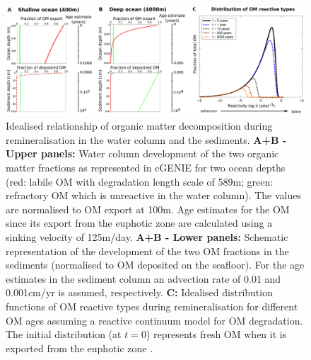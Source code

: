 \documentclass[gmd, manuscript]{copernicus}
\begin{document}
\begin{figure}[htbp]
\begin{center}
	\includegraphics[width=1.0\textwidth]{figures/OM_reactivity/OM_degradation_0808_updated.pdf}
	\caption{Idealised relationship of organic matter decomposition during remineralisation in the water column and the sediments. 
	\textbf{A+B - Upper panels:} Water column development of the two organic matter fractions as represented in cGENIE for two ocean depths 
	(red: labile OM with degradation length scale of 589m; green: refractory OM which is unreactive in the water column). The values are normalised to OM export at 100m. 
	Age estimates for the OM since its export from the euphotic zone are calculated using a sinking velocity of 125m/day. 
	\textbf{A+B - Lower panels:} Schematic representation of the development of the two OM fractions in the sediments (normalised to OM deposited on the seafloor). 
	For the age estimates in the sediment column an advection rate of 0.01 and 0.001cm/yr is assumed, respectively. 
	\textbf{C:} Idealised distribution functions of OM reactive types during remineralisation for different OM ages   
	assuming a reactive continuum model for OM degradation. The initial distribution (at $t=0$) represents fresh OM when it is exported from the euphotic zone 
	\citep[characterised by $a=3e^{-4}$ yr$^{-1}$ and $\nu=0.125$][]{boudreau_comment_2008}.
	}\label{fig:OM_reactivity}
\end{center}
\end{figure}
\end{document}
